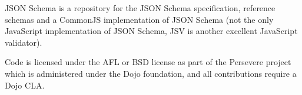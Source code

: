 JSON Schema is a repository for the JSON Schema specification, reference schemas and a Common\+JS implementation of JSON Schema (not the only Java\+Script implementation of JSON Schema, JSV is another excellent Java\+Script validator).

Code is licensed under the AFL or BSD license as part of the Persevere project which is administered under the Dojo foundation, and all contributions require a Dojo CLA. 